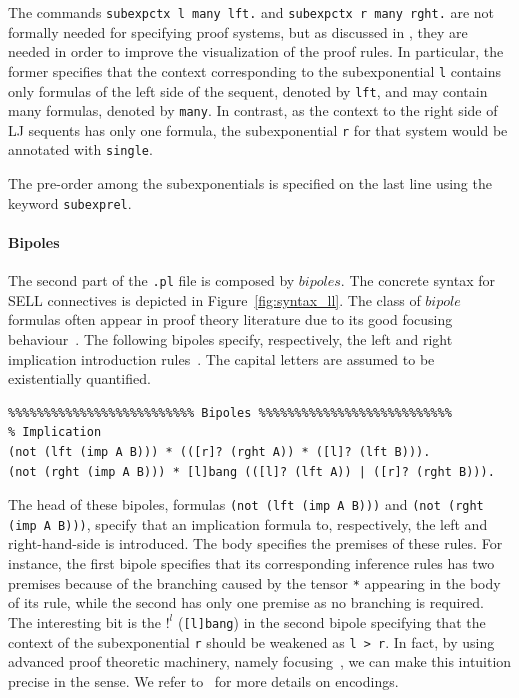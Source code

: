 \documentclass{llncs}
\begin{document}
The commands \texttt{subexpctx l many lft.} and  \texttt{subexpctx r many rght.} are not formally needed for specifying proof systems, 
but as discussed 
in \cite{nigam14ebl}, they are needed in order to improve the visualization of the proof rules. 
In particular, the former specifies that the context corresponding to the subexponential \texttt{l} contains 
only formulas of the left side of the sequent, denoted by \texttt{lft}, and may contain many formulas, denoted 
by \texttt{many}. In contrast, as the context to the right side of LJ sequents has only one formula, the 
subexponential \texttt{r} for that system would be annotated with \texttt{single}.

The pre-order among the subexponentials is specified on the last line using the
keyword \texttt{subexprel}.

\vspace{-2mm}

\paragraph{Bipoles}
%
The second part of the \texttt{.pl} file is composed by $bipoles$. The concrete syntax for SELL connectives
is depicted in Figure~\ref{fig:syntax_ll}. The class of $bipole$ formulas often
appear in proof theory literature due to its good focusing
behaviour~\cite{andreoli92jlc}. The following bipoles specify, 
respectively, the left and right implication introduction rules~\cite{nigam.jlc}. The capital 
letters are assumed to be existentially quantified.
\vspace{-1mm}

{\small
\begin{verbatim}
%%%%%%%%%%%%%%%%%%%%%%%%%% Bipoles %%%%%%%%%%%%%%%%%%%%%%%%%%%
% Implication
(not (lft (imp A B))) * (([r]? (rght A)) * ([l]? (lft B))).
(not (rght (imp A B))) * [l]bang (([l]? (lft A)) | ([r]? (rght B))).
\end{verbatim}
}

The head of these bipoles, formulas \texttt{(not (lft (imp A B)))} and
\texttt{(not (rght (imp A B)))}, specify that an implication formula to, respectively, 
the left and right-hand-side is introduced. The body specifies the premises of these
rules. For instance, the first bipole specifies that its corresponding inference rules
has two premises because of the branching caused by the  
tensor \texttt{*} appearing in the body of its rule, while
the second has only one premise as no branching is required. 
The interesting bit is the $!^l$ (\texttt{[l]bang}) in the second bipole specifying that the 
context of the subexponential \texttt{r} should be weakened as \texttt{l > r}.
In fact, by using advanced proof theoretic machinery, namely focusing~\cite{andreoli92jlc}, 
we can make this intuition precise in the sense. We refer to~\cite{nigam.jlc} for more details
on encodings.
\end{document}
